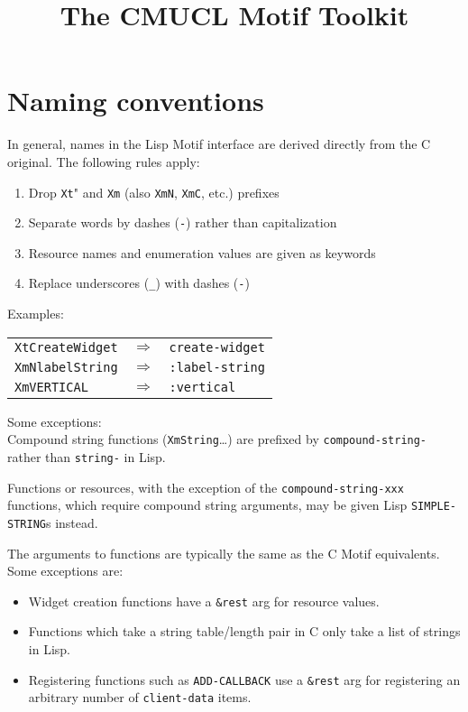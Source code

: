\documentclass[a4paper]{article}
\title{The CMUCL Motif Toolkit}
\begin{document}
\maketitle

\section{Naming conventions}

In general, names in the Lisp Motif interface are derived directly from
the C original.  The following rules apply:
\begin{enumerate}
   \item Drop \texttt{Xt}" and \texttt{Xm} (also \texttt{XmN},
	 \texttt{XmC}, etc.) prefixes 
   \item Separate words by dashes (\texttt{-}) rather than capitalization
   \item Resource names and enumeration values are given as keywords
   \item Replace underscores (\texttt{\_}) with dashes (\texttt{-})
\end{enumerate}

\vspace{2mm}

\noindent
Examples:\\[2mm]
\begin{tabular}{lcl}
\texttt{XtCreateWidget} & $\Longrightarrow$ & \texttt{create-widget}\\
\texttt{XmNlabelString} & $\Longrightarrow$ & \texttt{:label-string}\\
\texttt{XmVERTICAL}     & $\Longrightarrow$ & \texttt{:vertical}\\
\end{tabular}

\vspace{2mm}

\noindent
Some exceptions:\\
Compound string functions (\texttt{XmString}\ldots) are prefixed by
\texttt{compound-string-} rather than \texttt{string-} in Lisp.

Functions or resources, with the exception of the \texttt{compound-string-xxx}
functions, which require compound string arguments, may be given Lisp
\texttt{SIMPLE-STRING}s instead.

The arguments to functions are typically the same as the C Motif
equivalents.  Some exceptions are:
\begin{itemize}
\item	Widget creation functions have a \texttt{\&rest} arg for
	resource values.
\item	Functions which take a string table/length pair in C only take a
	list of strings in Lisp.
\item	Registering functions such as \texttt{ADD-CALLBACK} use a
	\texttt{\&rest} arg for registering an arbitrary number of
	\texttt{client-data} items. 
\end{itemize}
\end{document}
